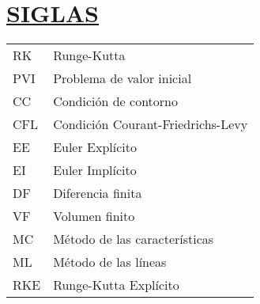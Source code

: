 \section*{\textbf{\underline{SIGLAS}}}

\begin{tabular}{L{1.0 cm}p{11.7 cm}}
    RK  & Runge-Kutta                       \\
    PVI & Problema de valor inicial         \\
    CC  & Condición de contorno             \\
    CFL & Condición Courant-Friedrichs-Levy \\
    EE  & Euler Explícito                   \\
    EI  & Euler Implícito                   \\
    DF  & Diferencia finita                 \\
    VF  & Volumen finito                    \\
    MC  & Método de las características     \\
    ML  & Método de las líneas              \\
    RKE & Runge-Kutta Explícito
\end{tabular}